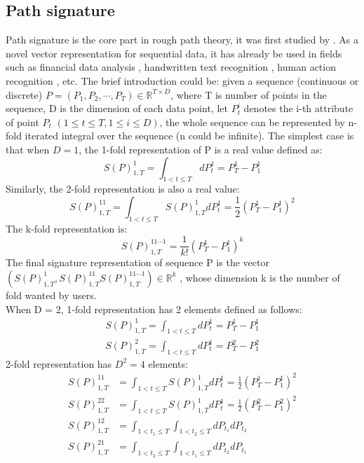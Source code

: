 \subsection{Path signature}
Path signature is the core part in rough path theory, it was first studied by \cite{chen1958integration}. As a novel vector representation for sequential data, it has already be used in fields such as financial data analysis \cite{gyurko2013extracting}, handwritten text recognition \cite{xie2016fully}, human action recognition \cite{yang2017developing}, etc. The brief introduction could be: given a sequence (continuous or discrete) $P = (P_1, P_2, \cdots, P_T) \in \mathbb{R}^{T \times D}$, where T is number of points in the sequence, D is the dimension of each data point, let $P_t^i$ denotes the i-th attribute of point $P_t$ $(1\le t\le T, 1 \le i \le D)$, the whole sequence can be represented by n-fold iterated integral over the sequence (n could be infinite). The simplest case is that when $D = 1$, the 1-fold representation of P is a real value defined as:
\begin{equation}
    S(P)_{1,T}^1 = \int_{1 < t \le T}dP_t^1 = P_T^1 - P_1^1
\end{equation}
Similarly, the 2-fold representation is also a real value:
\begin{equation}
    S(P)_{1,T}^{11} = \int_{1 < t \le T} S(P)_{1,T}^1dP_t^1 = \frac{1}{2} (P_T^1 - P_1^1)^2
\end{equation}
The k-fold representation is: 
\begin{equation}
    S(P)_{1,T}^{11\cdots 1} = \frac{1}{k!} (P_T^1 - P_1^1)^k
\end{equation}
The final signature representation of sequence P is the vector $(S(P)_{1,T}^1, S(P)_{1,T}^{11}S(P)_{1,T}^{11\cdots 1}) \in \mathbb{R}^k $ , whose dimension k is the number of fold wanted by users.\\
When D = 2, 1‐fold representation has 2 elements defined as follows:
\begin{equation}
    \begin{aligned}
        S(P)_{1,T}^1 = \int_{1 < t \le T}dP_t^1 = P_T^1 - P_1^1 \\
        S(P)_{1,T}^2 = \int_{1 < t \le T}dP_t^1 = P_T^2 - P_1^2
    \end{aligned}
\end{equation}
2-fold representation has $D^2 = 4$ elements:
\begin{equation}
    \begin{aligned}
        S(P)_{1,T}^{11} & = \int_{1 < t \le T} S(P)_{1,T}^1dP_t^1 = \frac{1}{2} (P_T^1 - P_1^1)^2 \\
        S(P)_{1,T}^{22} & = \int_{1 < t \le T} S(P)_{1,T}^1dP_t^1 = \frac{1}{2} (P_T^2 - P_1^2)^2 \\
        S(P)_{1,T}^{12} & = \int_{1 < t_1 \le T}\int_{1 < t_2 \le T}dP_{t_1}dP_{t_2} \\
        S(P)_{1,T}^{21} & = \int_{1 < t_2 \le T}\int_{1 < t_1 \le T}dP_{t_2}dP_{t_1}
    \end{aligned}
\end{equation}
